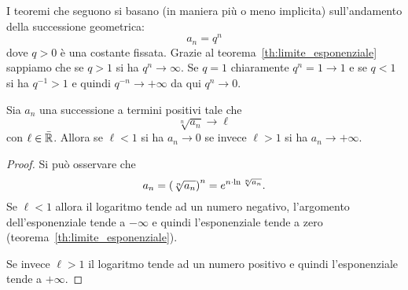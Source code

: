 I teoremi che seguono si basano (in maniera più o meno implicita)
sull'andamento della successione geometrica:
\[
  a_n = q^n
\]
dove $q>0$ è una costante fissata.
Grazie al teorema~\ref{th:limite_esponenziale}
sappiamo che se $q>1$ si ha $q^n\to \infty$.
Se $q=1$ chiaramente $q^n=1\to 1$
e se $q<1$ si ha $q^{-1}>1$ e quindi $q^{-n} \to +\infty$
da qui $q^n \to 0$.

\begin{theorem}
\label{th:criterio_radice}
\mymark{***}
Sia $a_n$ una successione a termini positivi tale che
\[
  \sqrt[n]{a_n} \to \ell
\]
con $\ell \in \bar {\mathbb R}$.
Allora se $\ell<1$ si ha $a_n \to 0$ se invece $\ell > 1$ si ha $a_n \to +\infty$.
\end{theorem}
%
\begin{comment}
\begin{proof}
\mymark{**}
Consideriamo prima il caso $\ell < 1$.
Se $\lim \sqrt{a_n} = \ell$ significa che per ogni $\eps>0$ la successione
$\sqrt{a_n}$ risulta definitivamente minore di $\ell +\eps$.
Scegliendo opportunamente $\eps$ (ad esempio $\eps = (1-\ell)/2$) si potrà
avere $q = \ell+\eps < 1$. Dunque avremo definitivamente $\sqrt[n]{a_n}< q$
ovvero $a_n < q^n$. Per ipotesi $a_n\ge 0$
e quindi, tolto un numero finito di termini, si ottiene $0 \le a_n < q^n \to 0$
da cui $a_n \to 0$ (in quanto l'aver tolto un numero finito di termini non
cambia né il carattere né il limite della successione).

Se $\ell>1$ si potrà procedere in maniera analoga. Esisterà $q$ con $1 < q < \ell$ tale che definitivamente $\sqrt[n]{a_n} > q$ da cui $a_n > q^n \to +\infty$.
\end{proof}
\end{comment}

\begin{proof}
  Si può osservare che
  \[
    a_n = {\left( \sqrt[n]{a_n} \right)}^n
     = e^{n \cdot \ln \sqrt[n]{a_n}}.
  \]
  Se $\ell <1$ allora il logaritmo tende ad un numero negativo,
  l'argomento dell'esponenziale tende a $-\infty$ e quindi l'esponenziale tende a zero (teorema~\ref{th:limite_esponenziale}).

  Se invece $\ell>1$ il logaritmo tende ad un numero positivo e quindi l'esponenziale tende a $+\infty$.
\end{proof}

